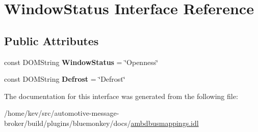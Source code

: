 \hypertarget{interfaceWindowStatus}{\section{Window\+Status Interface Reference}
\label{interfaceWindowStatus}
}
\subsection*{Public Attributes}
\begin{DoxyCompactItemize}
\item 
\hypertarget{interfaceWindowStatus_a74f606f1b64d41de4c6f384a2b11e5cb}{const D\+O\+M\+String {\bfseries Window\+Status} = \char`\"{}Openness\char`\"{}}\label{interfaceWindowStatus_a74f606f1b64d41de4c6f384a2b11e5cb}

\item 
\hypertarget{interfaceWindowStatus_a0bbf80007f7d60fa748fa730cb53fc12}{const D\+O\+M\+String {\bfseries Defrost} = \char`\"{}Defrost\char`\"{}}\label{interfaceWindowStatus_a0bbf80007f7d60fa748fa730cb53fc12}

\end{DoxyCompactItemize}


The documentation for this interface was generated from the following file\+:\begin{DoxyCompactItemize}
\item 
/home/kev/src/automotive-\/message-\/broker/build/plugins/bluemonkey/docs/\hyperlink{ambdbusmappings_8idl}{ambdbusmappings.\+idl}\end{DoxyCompactItemize}
